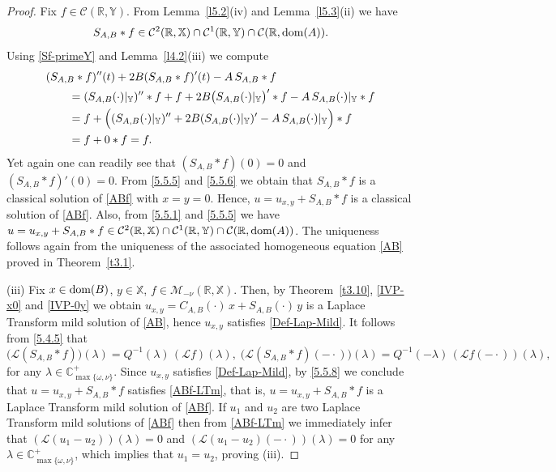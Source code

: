 \documentclass[11pt]{amsart}
\numberwithin{equation}{section}
\theoremstyle{remark}
\theoremstyle{definition}
\newcommand\bX{{\mathbb X}}
\newcommand\bY{{\mathbb Y}}
\newcommand{\dom}{\text{\rm{dom}}}
\begin{document}
\begin{proof}
	Fix $f \in \mathcal{C}(\mathbb{R}, \bY)$. From Lemma~\ref{l5.2}(iv) and Lemma~\ref{l5.3}(ii) we have
	\begin{equation}\label{5.5.5}  S_{A,B} * f \in \mathcal{C}^2(\mathbb{R}, \bX) \cap \mathcal{C}^1(\mathbb{R}, \bY) \cap \mathcal{C}(\mathbb{R}, \dom(A)).
	\end{equation}
	Using \eqref{Sf-primeY} and Lemma~\ref{l4.2}(iii) we compute
	\begin{align}\label{5.5.6}
		&(S_{A,B} * f)''(t) + 2B(S_{A,B} * f)'(t) - A\,S_{A,B} * f \nonumber\\
		&\qquad= (S_{A,B}(\cdot)|_\bY)'' * f + f + 2B\bigl(S_{A,B}(\cdot)|_\bY\bigr)' * f - A\,S_{A,B}(\cdot)|_\bY * f \nonumber\\
		&\qquad= f + \Bigl((S_{A,B}(\cdot)|_\bY)'' + 2B(S_{A,B}(\cdot)|_\bY)' - A\,S_{A,B}(\cdot)|_\bY\Bigr) * f \nonumber\\
		&\qquad= f + 0 * f = f.
	\end{align}
	Yet again one can readily see that $(S_{A,B} * f)(0) = 0$ and  $(S_{A,B} * f)'(0) = 0$. From \eqref{5.5.5} and \eqref{5.5.6} we obtain that $S_{A,B} * f$ is a classical solution of \eqref{ABf} with $x = y = 0$. Hence, $u = u_{x,y} + S_{A,B} * f$ is a classical solution of \eqref{ABf}. Also, from \eqref{5.5.1} and \eqref{5.5.5} we have $u = u_{x,y} + S_{A,B} * f \in \mathcal{C}^2(\mathbb{R}, \bX) \cap \mathcal{C}^1(\mathbb{R}, \bY) \cap \mathcal{C}(\mathbb{R}, \dom(A))$. The uniqueness follows again from the uniqueness of the associated homogeneous equation \eqref{AB} proved in Theorem~\ref{t3.1}.
	
	(iii) Fix $x \in \dom(B)$, $y \in \bX$, $f \in \mathcal{M}_{-\nu}(\mathbb{R}, \bX)$. Then, by Theorem~\ref{t3.10}, \eqref{IVP-x0} and \eqref{IVP-0y} we obtain $u_{x,y} = C_{A,B}(\cdot)\,x + S_{A,B}(\cdot)\,y$ is a Laplace Transform mild solution of \eqref{AB}, hence $u_{x,y}$ satisfies \eqref{Def-Lap-Mild}. It follows from \eqref{5.4.5} that
	\begin{equation}\label{5.5.8} \bigl(\mathcal{L}(S_{A,B} * f)\bigr)(\lambda) = Q^{-1}(\lambda)\,(\mathcal{L}f)(\lambda), \; \bigl(\mathcal{L}(S_{A,B} * f)(-\cdot)\bigr)(\lambda) = Q^{-1}(-\lambda)\,(\mathcal{L}f(-\cdot))(\lambda),
	\end{equation}
	for any $\lambda \in \mathbb{C}^+_{\max\{\omega, \nu\}}$. Since $u_{x,y}$ satisfies \eqref{Def-Lap-Mild}, by \eqref{5.5.8} we conclude that $u = u_{x,y} + S_{A,B} * f$ satisfies \eqref{ABf-LTm}, that is, $u = u_{x,y} + S_{A,B} * f$ is a Laplace Transform mild solution of \eqref{ABf}. If $u_1$ and $u_2$ are two Laplace Transform mild solutions of \eqref{ABf} then from \eqref{ABf-LTm} we immediately infer that $(\mathcal{L}(u_1 - u_2))(\lambda) = 0$ and $(\mathcal{L}(u_1 - u_2)(-\cdot))(\lambda) = 0$ for any $\lambda \in \mathbb{C}^+_{\max\{\omega,\nu\}}$, which implies that $u_1 = u_2$, proving (iii).
	

\end{proof}
\end{document}
